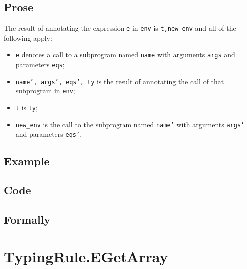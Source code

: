 \documentclass{book}
\begin{document}
  \subsection{Prose}
  The result of annotating the expression \texttt{e} in \texttt{env} is
\texttt{t,new\_env} and all of the following apply:
  \begin{itemize}
  \item \texttt{e} denotes a call to a subprogram named \texttt{name} with arguments \texttt{args} and
    parameters \texttt{eqs};
  \item \texttt{name', args', eqs', ty} is the result of annotating the call of
    that subprogram in \texttt{env};
  \item \texttt{t} is \texttt{ty};
  \item \texttt{new\_env} is the call to the subprogram named \texttt{name'} with arguments \texttt{args'}
    and parameters \texttt{eqs'}.
  \end{itemize}

  \subsection{Example}

  \subsection{Code}

\begin{emptyformal}
    \subsection{Formally}
\end{emptyformal}


\section{TypingRule.EGetArray \label{sec:TypingRule.EGetArray}}
\end{document}
